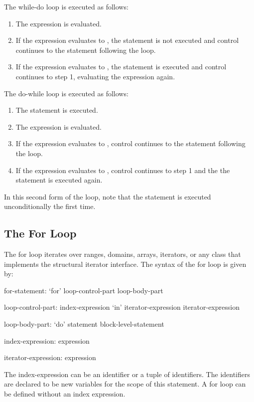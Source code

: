 The while-do loop is executed as follows:
\begin{enumerate}
\item The expression is evaluated.
\item If the expression evaluates to , the statement is
  not executed and control continues to the statement following the
  loop.
\item If the expression evaluates to , the statement is
  executed and control continues to step 1, evaluating the expression
  again.
\end{enumerate}

The do-while loop is executed as follows:
\begin{enumerate}
\item The statement is executed.
\item The expression is evaluated.
\item If the expression evaluates to , control continues
  to the statement following the loop.
\item If the expression evaluates to , control continues to
  step 1 and the the statement is executed again.
\end{enumerate}
In this second form of the loop, note that the statement is executed
unconditionally the first time.

\subsection{The For Loop}
\label{The_For_Loop}


The for loop iterates over ranges, domains, arrays, iterators, or
any class that implements the structural iterator interface.  The
syntax of the for loop is given by:
\begin{syntax}
for-statement:
  `for' loop-control-part loop-body-part

loop-control-part:
  index-expression `in' iterator-expression
  iterator-expression

loop-body-part:
  `do' statement
  block-level-statement

index-expression:
  expression

iterator-expression:
  expression
\end{syntax}

The index-expression can be an identifier or a tuple of identifiers.
The identifiers are declared to be new variables for the scope of this
statement.  A for loop can be defined without an index expression.

